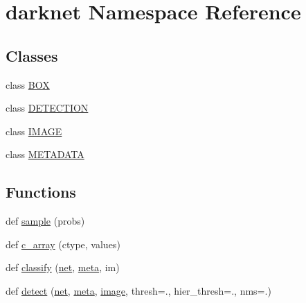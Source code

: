 \hypertarget{namespacedarknet}{}\section{darknet Namespace Reference}
\label{namespacedarknet}
\subsection*{Classes}
\begin{DoxyCompactItemize}
\item 
class \mbox{\hyperlink{classdarknet_1_1BOX}{B\+OX}}
\item 
class \mbox{\hyperlink{classdarknet_1_1DETECTION}{D\+E\+T\+E\+C\+T\+I\+ON}}
\item 
class \mbox{\hyperlink{classdarknet_1_1IMAGE}{I\+M\+A\+GE}}
\item 
class \mbox{\hyperlink{classdarknet_1_1METADATA}{M\+E\+T\+A\+D\+A\+TA}}
\end{DoxyCompactItemize}
\subsection*{Functions}
\begin{DoxyCompactItemize}
\item 
def \mbox{\hyperlink{namespacedarknet_ab65a52b5c81d82e6149ba8882d5ac84a}{sample}} (probs)
\item 
def \mbox{\hyperlink{namespacedarknet_a93a1a223ce8f666f922866b31af77b38}{c\+\_\+array}} (ctype, values)
\item 
def \mbox{\hyperlink{namespacedarknet_a6f04d83a940049bd6ec10ab0ce9480eb}{classify}} (\mbox{\hyperlink{namespacedarknet_adc6a45d045e33aea7cdb3d217a6a7d35}{net}}, \mbox{\hyperlink{namespacedarknet_ae61a1edabe435136c755d64a6183a9c0}{meta}}, im)
\item 
def \mbox{\hyperlink{namespacedarknet_a7d3eaf0113e0b328013aa81edaad9f91}{detect}} (\mbox{\hyperlink{namespacedarknet_adc6a45d045e33aea7cdb3d217a6a7d35}{net}}, \mbox{\hyperlink{namespacedarknet_ae61a1edabe435136c755d64a6183a9c0}{meta}}, \mbox{\hyperlink{structimage}{image}}, thresh=., hier\+\_\+thresh=., nms=.)
\end{DoxyCompactItemize}
